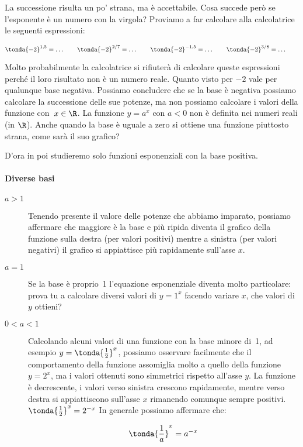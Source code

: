 La successione risulta un po' strana, ma è accettabile. Cosa succede però se 
l'esponente è un numero con la virgola? Proviamo a far calcolare alla 
calcolatrice le seguenti espressioni:

\[\tonda{-2}^{1,5}= \dots \qquad \tonda{-2}^{2/7}= \dots \qquad 
 \tonda{-2}^{-1,5}= \dots \qquad \tonda{-2}^{3/8}= \dots \qquad 
\]

Molto probabilmente la calcolatrice si rifiuterà di calcolare queste 
espressioni perché il loro risultato non è un numero reale. 
Quanto visto per \(-2\) vale per qualunque base negativa.
Possiamo concludere che se la base è negativa possiamo calcolare la successione 
delle sue potenze, ma non possiamo calcolare i valori della funzione 
con~\(x \in \R\). 
La funzione \(y=a^x \text{ con } a<0\) non è definita nei numeri reali 
(in \(\R\)).
Anche quando la base è uguale a zero si ottiene una funzione piuttosto strana, 
come sarà il suo grafico?

D'ora in poi studieremo solo funzioni esponenziali con la base positiva.

\paragraph{Diverse basi}
\label{par:esplog_diversebasi}

\begin{description}
 \item [\(a>1\)]
Tenendo presente il valore delle potenze che abbiamo imparato, possiamo 
affermare che maggiore è la base e più ripida diventa il grafico della funzione 
sulla destra (per valori positivi) mentre a sinistra (per valori negativi) il 
grafico si appiattisce più rapidamente sull'asse \(x\).
 \item [\(a=1\)]
Se la base è proprio~1 l'equazione esponenziale 
diventa molto particolare: prova tu a calcolare diversi valori di \(y=1^x\) 
facendo variare \(x\), che valori di \(y\) ottieni?
 \item [\(0<a<1\)]
Calcolando alcuni valori di una funzione con la base minore di~1, 
ad esempio \(y=\tonda{\frac{1}{2}}^x\), possiamo osservare facilmente che il 
comportamento della funzione assomiglia molto a quello della funzione
\(y=2^x\), ma i valori ottenuti sono simmetrici rispetto all'asse \(y\). 
La funzione è decrescente, i valori verso sinistra crescono rapidamente, mentre 
verso destra si appiattiscono sull'asse \(x\) rimanendo comunque sempre 
positivi.
\(\tonda{\frac{1}{2}}^x = 2^{-x}\)
In generale possiamo affermare che:

\[\tonda{\frac{1}{a}}^x = a^{-x}\]
\end{description}

